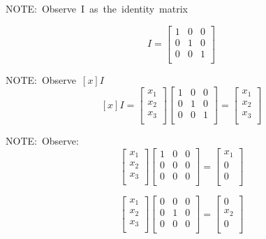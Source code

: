 \documentclass{article}
\begin{document}
\hbox{NOTE: Observe I as the identity matrix}

\begin{equation}
    I = \begin{bmatrix}
        1 & 0 & 0\\
        0 & 1 & 0\\
        0 & 0 & 1\\
    \end{bmatrix}
\end{equation}

\hbox{NOTE: Observe $[x]I$}
\[
[x]I = \begin{bmatrix}   
    x_1\\
    x_2\\
    x_3\\
    \end{bmatrix}
%
\begin{bmatrix}   
    1 & 0 & 0 \\
    0 & 1 & 0 \\
    0 & 0 & 1 \\
    \end{bmatrix} = 
%
    \begin{bmatrix}
        x_1\\
        x_2\\
        x_3\\
    \end{bmatrix}
\]

\hbox{NOTE: Observe:}
\[
\begin{bmatrix}   
    x_1\\
    x_2\\
    x_3\\
    \end{bmatrix}
%
\begin{bmatrix}   
    1 & 0 & 0 \\
    0 & 0 & 0 \\
    0 & 0 & 0 \\
    \end{bmatrix} = 
%
    \begin{bmatrix}
        x_1\\
        0\\
        0\\
    \end{bmatrix}
\]

\[
\begin{bmatrix}   
    x_1\\
    x_2\\
    x_3\\
    \end{bmatrix}
%
\begin{bmatrix}   
    0 & 0 & 0 \\
    0 & 1 & 0 \\
    0 & 0 & 0 \\
    \end{bmatrix} = 
%
    \begin{bmatrix}
        0\\
        x_2\\
        0\\
    \end{bmatrix}
\]
\end{document}
